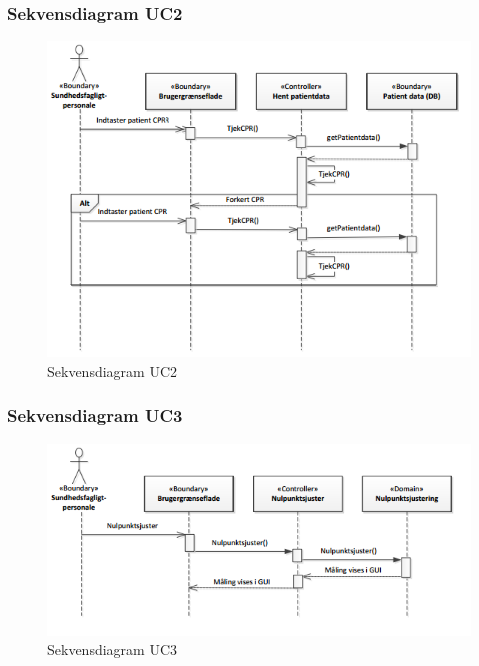 \subsubsection{Sekvensdiagram UC2}
\begin{figure}[H]
\centering
\includegraphics[scale=0.70]{sd2.PNG}
\caption{Sekvensdiagram UC2}
\end{figure}

\subsubsection{Sekvensdiagram UC3}
\begin{figure}[H]
\centering
\includegraphics[scale=0.70]{sd3.PNG}
\caption{Sekvensdiagram UC3}
\end{figure}

